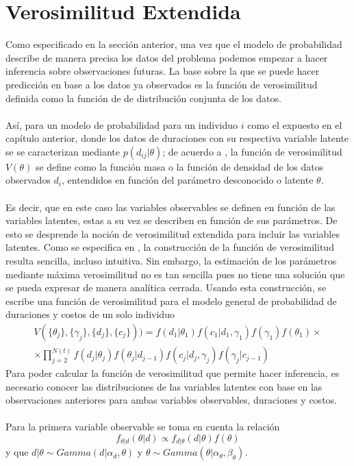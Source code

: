 \section{Verosimilitud Extendida}
Como especificado en la secci\'on anterior, una vez que el modelo de probabilidad describe de manera precisa los datos del problema podemos empezar a hacer inferencia sobre observaciones futuras. La base sobre la que se puede hacer predicci\'on en base a los datos ya observados es la funci\'on de verosimilitud definida como la funci\'on de de distribuci\'on conjunta de los datos.\\
\\
As\'i, para un modelo de probabilidad para un individuo $i$ como el expuesto en el cap\'itulo anterior, donde los datos de duraciones con su respectiva variable latente se se caracterizan mediante $p(d_{ij}|\theta)$; de acuerdo a \cite{held2014applied}, la funci\'on de verosimilitud $V(\theta)$ se define como la funci\'on masa o la funci\'on de densidad de los datos observados $d_i$, entendidos en funci\'on del par\'ametro desconocido o latente $\theta$.\\
\\
Es decir, que en este caso las variables observables se definen en funci\'on de las variables latentes, estas a su vez se describen en funci\'on de sus par\'ametros. De esto se desprende la noci\'on de verosimilitud extendida para incluir las variables latentes. Como se especifica en \cite{pitt2002constructing}, la construcci\'on de la funci\'on de verosimilitud resulta sencilla, incluso intuitiva. Sin embargo, la estimaci\'on de los par\'ametros mediante m\'axima verosimilitud no es tan sencilla pues no tiene una soluci\'on que se pueda expresar de manera anal\'itica cerrada. Usando esta construcci\'on, se escribe una funci\'on de verosimilitud para el modelo general de probabilidad de duraciones y costos de un solo individuo\\
\begin{multline*}
V(\{\theta_j\},\{\gamma_j\},\{d_j\},\{c_j\}) ) = f(d_1|\theta_1)f(c_1|d_1,\gamma_1)f(\gamma_1) f(\theta_1)\times\\
 \times  \prod_{j=2}^{N(t)} f(d_j|\theta_j)f(\theta_j|d_{j-1})f(c_j|d_j,\gamma_j)f(\gamma_j|c_{j-1})
\end{multline*}
Para poder calcular la funci\'on de verosimilitud que permite hacer inferencia, es necesario conocer las distribuciones de las variables latentes con base en las observaciones anteriores para ambas variables observables, duraciones y costos.\\
\\Para la primera variable observable se toma en cuenta la relaci\'on 
\[f_{\theta|d}(\theta|d)\propto f_{d|\theta}(d|\theta)f(\theta)\]
y que $d|\theta \sim Gamma(d|\alpha_d,\theta)$ y $\theta \sim Gamma(\theta|\alpha_\theta,\beta_\theta)$.

